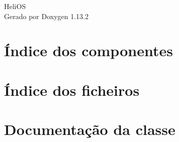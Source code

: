 \documentclass[twoside]{book}
\newcommand{\+}{\discretionary{\mbox{\scriptsize$\hookleftarrow$}}{}{}}
\newcommand{\clearemptydoublepage}{%
    \newpage{\pagestyle{empty}\cleardoublepage}%
  }
\begin{document}
  \raggedbottom
    \hypersetup{pageanchor=false,
                bookmarksnumbered=true,
                pdfencoding=unicode
               }
  \begin{titlepage}
  \vspace*{7cm}
  \begin{center}%
  {\Large Heli\+OS}\\
  \vspace*{1cm}
  {\large Gerado por Doxygen 1.13.2}\\
  \end{center}
  \end{titlepage}
  \clearemptydoublepage
  \tableofcontents
  \clearemptydoublepage
  \hypersetup{pageanchor=true}
\chapter{Índice dos componentes}

\chapter{Índice dos ficheiros}

\chapter{Documentação da classe}































\end{document}
